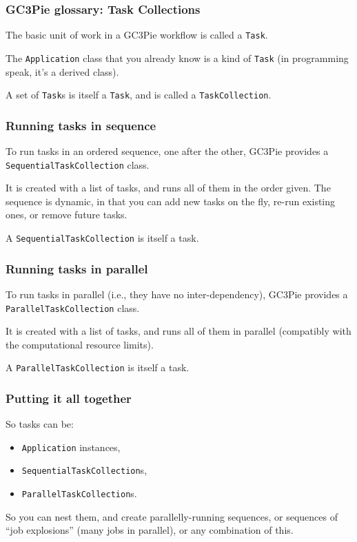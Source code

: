 \documentclass[english,serif,mathserif,usenames,dvipsnames]{beamer}
\begin{document}
\begin{frame}
  \frametitle{GC3Pie glossary: Task Collections}

  The basic unit of work in a GC3Pie workflow is called a \texttt{Task}.

  \+
  The \texttt{Application} class that you already know is a kind of
  \texttt{Task} (in programming speak, it's a derived class).

  \+
  A set of \texttt{Task}s is itself a \texttt{Task}, and is called a \texttt{TaskCollection}.
\end{frame}


\begin{frame}
  \frametitle{Running tasks in sequence}

  To run tasks in an ordered sequence, one after the other, GC3Pie
  provides a \texttt{SequentialTaskCollection} class.

  \+
  It is created with a list of tasks, and runs all of them in the
  order given.  The sequence is dynamic, in that you can add new tasks
  on the fly, re-run existing ones, or remove future tasks.

  \+
  A \texttt{SequentialTaskCollection} is itself a task.
\end{frame}


\begin{frame}
  \frametitle{Running tasks in parallel}

  To run tasks in parallel (i.e., they have no inter-dependency),
  GC3Pie provides a \texttt{ParallelTaskCollection} class.

  \+
  It is created with a list of tasks, and runs all of them
  in parallel (compatibly with the computational resource limits).

  \+
  A \texttt{ParallelTaskCollection} is itself a task.

\end{frame}


\begin{frame}
  \frametitle{Putting it all together}
  So tasks can be:
  \begin{itemize}
  \item \texttt{Application} instances,
  \item \texttt{SequentialTaskCollection}s,
  \item \texttt{ParallelTaskCollection}s.
  \end{itemize}

  \+
  So you can nest them, and create parallelly-running sequences, or
  sequences of ``job explosions'' (many jobs in parallel), or any
  combination of this.
\end{frame}
\end{document}
